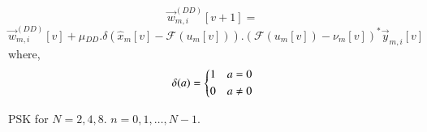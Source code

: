 \documentclass[journal,12pt,onecolumn]{IEEEtran}
\begin{document}
 \begin{equation*}
\vec{w}^{(DD)}_{m,i}[v+1] = 
 \end{equation*}
 \begin{equation*}
 \vec{w}^{(DD)}_{m,i}[v] + \mu{_{DD}}.\delta(\hat{x}_m[v]-{\mathcal{F}}(u_m[v])).({\mathcal{F}}(u_m[v]) - {\nu_m[v]})^*\vec{y}_{m,i}[v]
 \end{equation*}
 where,
\begin{align*}
\delta(a)=  \begin{dcases}
        1 & a=0 \\
        0 & a\neq 0 \\
    \end{dcases}
\end{align*} 

\begin{table}[!ht]
\begin{center}

\end{center}
\caption{PSK for $N=2,4,8$. $n = 0, 1, \dots, N-1.$}
\label{table:psk}
\end{table}
\end{document}
